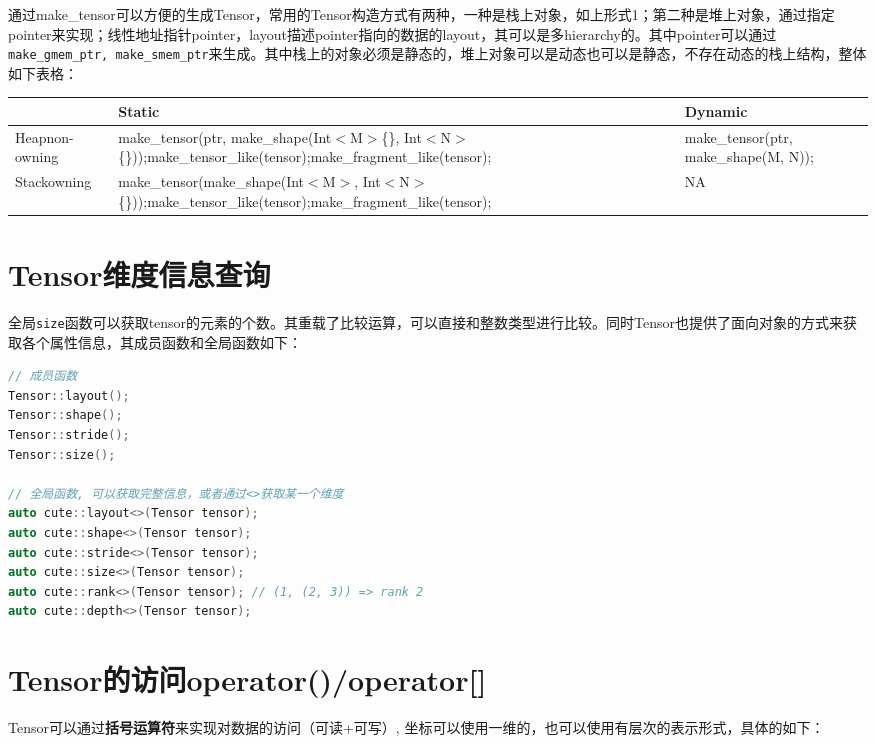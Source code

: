 通过make\_tensor可以方便的生成Tensor，常用的Tensor构造方式有两种，一种是栈上对象，如上形式1；第二种是堆上对象，通过指定pointer来实现；线性地址指针pointer，layout描述pointer指向的数据的layout，其可以是多hierarchy的。其中pointer可以通过\verb|make_gmem_ptr, make_smem_ptr|来生成。其中栈上的对象必须是静态的，堆上对象可以是动态也可以是静态，不存在动态的栈上结构，整体如下表格：

\begin{center}\small
\begin{tabular}{p{}p{}p{}}
\toprule
 & Static & Dynamic \\
\midrule
Heapnon-owning & make\_tensor(ptr, make\_shape(Int$<$M$>$\{\}, Int$<$N$>$\{\}));make\_tensor\_like(tensor);make\_fragment\_like(tensor); & make\_tensor(ptr, make\_shape(M, N)); \\
Stackowning & make\_tensor(make\_shape(Int$<$M$>$, Int$<$N$>$\{\}));make\_tensor\_like(tensor);make\_fragment\_like(tensor); & NA \\
\bottomrule
\end{tabular}
\end{center}

\section{Tensor维度信息查询}

全局\verb|size|函数可以获取tensor的元素的个数。其重载了比较运算，可以直接和整数类型进行比较。同时Tensor也提供了面向对象的方式来获取各个属性信息，其成员函数和全局函数如下：

\begin{lstlisting}[language=C++]
// 成员函数
Tensor::layout();
Tensor::shape();
Tensor::stride();
Tensor::size();

// 全局函数, 可以获取完整信息，或者通过<>获取某一个维度
auto cute::layout<>(Tensor tensor);
auto cute::shape<>(Tensor tensor);
auto cute::stride<>(Tensor tensor);
auto cute::size<>(Tensor tensor);
auto cute::rank<>(Tensor tensor); // (1, (2, 3)) => rank 2
auto cute::depth<>(Tensor tensor);
\end{lstlisting}

\section{Tensor的访问operator()/operator[]}

Tensor可以通过\textbf{括号运算符}来实现对数据的访问（可读+可写）, 坐标可以使用一维的，也可以使用有层次的表示形式，具体的如下：

